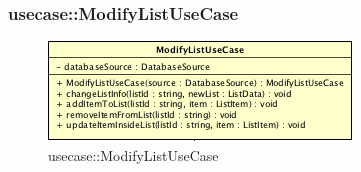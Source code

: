 \subsubsection{usecase::ModifyListUseCase}

\label{usecase::ModifyListUseCase}
\begin{figure}[ht]
	\centering
	\includegraphics[scale=0.5]{Sezioni/SottosezioniST/img/app/ModifyListUseCase.png}
	\caption{usecase::ModifyListUseCase}
\end{figure}


